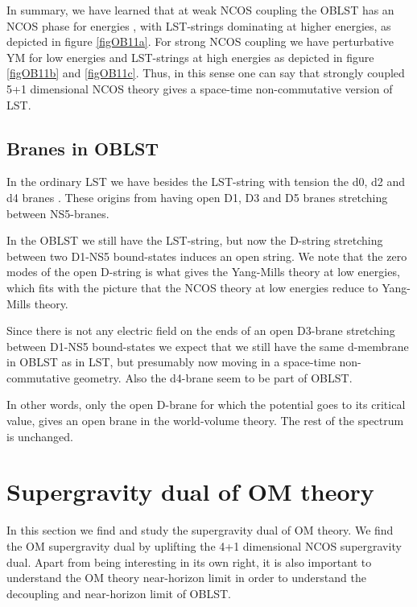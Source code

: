 \documentclass[a4paper,twoside,titlepage,12pt]{article}
\begin{document}
In summary, we have learned that at weak NCOS coupling \coordHE{} 
the \coordHE{} OBLST has an NCOS phase for energies
\coordHE{}, with LST-strings dominating at higher energies, 
as depicted in figure \ref{figOB11a}.
For strong NCOS coupling \coordHE{} we have
perturbative YM for low energies and LST-strings at high energies
as depicted in figure \ref{figOB11b} and \ref{figOB11c}.
Thus, in this sense one can say that strongly coupled 5+1 dimensional
NCOS theory gives a space-time non-commutative version of \coordHE{} LST.


\subsection{Branes in \coordHE{} OBLST}

In the ordinary \coordHE{} LST we have besides the LST-string with
tension \coordHE{} the d0, d2 and d4 branes \cite{Losev:1997hx}.
These origins from having open D1, D3 and D5 branes
stretching between NS5-branes.

In the \coordHE{} OBLST we still have the LST-string, but now the
D-string stretching between two D1-NS5 bound-states induces
an open string. 
We note that the zero modes of the open D-string
is what gives the Yang-Mills
theory at low energies, which fits with the picture that the 
NCOS theory at low energies reduce to Yang-Mills theory.

Since there is not any electric field on the ends of an open D3-brane
stretching between D1-NS5 bound-states
 we expect that we still have the same d-membrane
in \coordHE{} OBLST as in \coordHE{} LST, but presumably now moving in a 
space-time non-commutative geometry.
Also the d4-brane seem to be part of \coordHE{} OBLST.

In other words, only the open D-brane for which the potential goes to
its critical value, gives an open brane in the world-volume theory.
The rest of the spectrum is unchanged.


\section{Supergravity dual of OM theory}
\label{secOMdual}

In this section we find and study the supergravity dual of
OM theory.
We find the OM supergravity dual by uplifting the 4+1 dimensional
NCOS supergravity dual.
Apart from being interesting in its own right, it is also
important to understand the OM theory near-horizon limit 
in order to understand the decoupling and near-horizon 
limit of \coordHE{} OBLST. 
\end{document}
